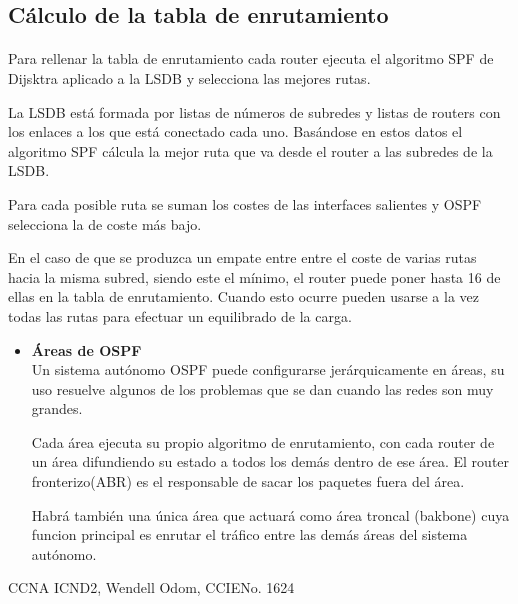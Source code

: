 \documentclass[a4paper,11pt]{article}
\begin{document}
\subsection{Cálculo de la tabla de enrutamiento}
\paragraph{  }
Para rellenar la tabla de enrutamiento cada router ejecuta el algoritmo SPF de Dijsktra aplicado a la LSDB y selecciona las mejores rutas.

La LSDB está formada por listas de números de subredes y listas de routers con los enlaces a los que está conectado cada uno. Basándose en estos datos el algoritmo SPF cálcula la mejor ruta que va desde el router a las subredes de la LSDB.

Para cada posible ruta se suman los costes de las interfaces salientes y OSPF selecciona la de coste más bajo. 

En el caso de que se produzca un empate entre entre el coste de varias rutas hacia la misma subred, siendo este el mínimo, el router puede poner hasta 16 de ellas en la tabla de enrutamiento. Cuando esto ocurre pueden usarse a la vez todas las rutas para efectuar un equilibrado de la carga.

\begin{itemize}
  \item \textbf{Áreas de OSPF}\\
  Un sistema autónomo OSPF puede configurarse jerárquicamente en áreas, su uso resuelve algunos de los problemas que se dan cuando las redes son muy grandes.
  
  Cada área ejecuta su propio algoritmo de enrutamiento, con cada router de un área difundiendo su estado a todos los demás dentro de ese área. El router fronterizo(ABR) es el responsable de sacar los paquetes fuera del área.
  
  Habrá también una única área que actuará como área troncal (bakbone) cuya funcion principal es enrutar el tráfico entre las demás áreas del sistema autónomo.
\end{itemize}







\begin{thebibliography}{99}
  CCNA ICND2, Wendell Odom, CCIE\textregistered  No. 1624
\end{thebibliography}
\end{document}
